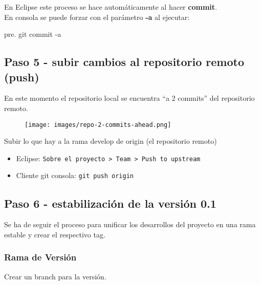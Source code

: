 En Eclipse este proceso se hace automáticamente al hacer
\textbf{commit}.\\En consola se puede forzar con el parámetro
\textbf{-a} al ejecutar:

pre. git commit -a

\subsection{Paso 5 - subir cambios al repositorio remoto (push)}

En este momento el repositorio local se encuentra ``a 2 commits'' del
repositorio remoto.

\begin{figure}[htbp]
\centering
\texttt{[image: images/repo-2-commits-ahead.png]}
\caption{}
\end{figure}

Subir lo que hay a la rama develop de origin (el repositorio remoto)

\begin{itemize}
\item
  Eclipse:
  \texttt{Sobre el proyecto \textgreater{} Team \textgreater{} Push to upstream}
\item
  Cliente git consola: \texttt{git push origin}
\end{itemize}
\subsection{Paso 6 - estabilización de la versión 0.1}

Se ha de seguir el proceso para unificar los desarrollos del proyecto en
una rama estable y crear el respectivo tag.

\subsubsection{Rama de Versión}

Crear un branch para la versión.

